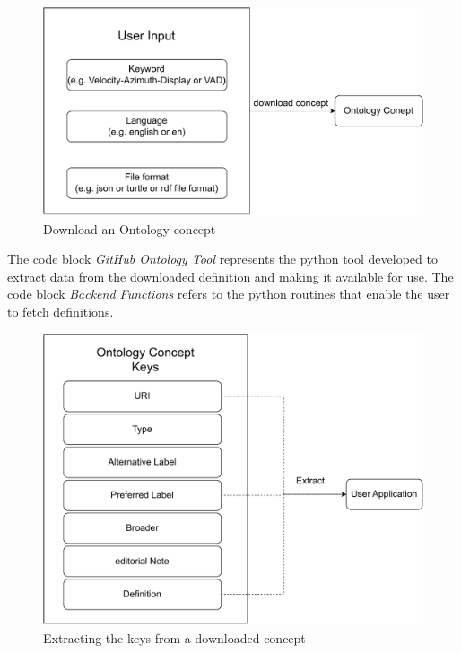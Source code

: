 \documentclass[remotesensing,article,submit,pdftex,moreauthors]{Definitions/mdpi}
\begin{document}
\begin{figure}[htpb!]
    \centering
    \includegraphics[width=\textwidth]{Figures/download_concept.pdf}
    \caption{Download an Ontology concept}
    \label{fig:download_concept}
\end{figure}

The code block \textit{GitHub Ontology Tool} represents the python tool developed to extract data from the downloaded definition and making it available for use. The code block \textit{Backend Functions} refers to the python routines that enable the user to fetch definitions.

\begin{figure}[htpb!]
    \centering
    \includegraphics[width=\textwidth]{Figures/extract_keys.pdf}
    \caption{Extracting the keys from a downloaded concept}
    \label{fig:extract_keys}
\end{figure}
\end{document}
